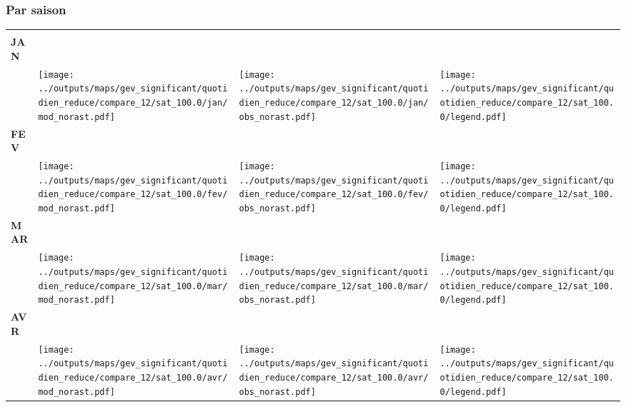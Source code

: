 \documentclass[
  letterpaper,
  DIV=11,
  numbers=noendperiod]{scrartcl}
\begin{document}
\subsubsection{Par saison}\label{par-saison-6}

\begin{longtable*}{m{2.0cm}m{7.9cm}m{7.9cm}m{1cm}}
 & \centering  & \centering  & \tabularnewline
\centering \textbf{JAN} \\[0.2em] \begin{tabular}{r@{\hspace{0.2em}}l}\end{tabular} & \centering \texttt{[image: ../outputs/maps/gev\_significant/quotidien\_reduce/compare\_12/sat\_100.0/jan/mod\_norast.pdf]} & \centering \texttt{[image: ../outputs/maps/gev\_significant/quotidien\_reduce/compare\_12/sat\_100.0/jan/obs\_norast.pdf]} & \centering \texttt{[image: ../outputs/maps/gev\_significant/quotidien\_reduce/compare\_12/sat\_100.0/legend.pdf]} \tabularnewline
\centering \textbf{FEV} \\[0.2em] \begin{tabular}{r@{\hspace{0.2em}}l}\end{tabular} & \centering \texttt{[image: ../outputs/maps/gev\_significant/quotidien\_reduce/compare\_12/sat\_100.0/fev/mod\_norast.pdf]} & \centering \texttt{[image: ../outputs/maps/gev\_significant/quotidien\_reduce/compare\_12/sat\_100.0/fev/obs\_norast.pdf]} & \centering \texttt{[image: ../outputs/maps/gev\_significant/quotidien\_reduce/compare\_12/sat\_100.0/legend.pdf]} \tabularnewline
\centering \textbf{MAR} \\[0.2em] \begin{tabular}{r@{\hspace{0.2em}}l}\end{tabular} & \centering \texttt{[image: ../outputs/maps/gev\_significant/quotidien\_reduce/compare\_12/sat\_100.0/mar/mod\_norast.pdf]} & \centering \texttt{[image: ../outputs/maps/gev\_significant/quotidien\_reduce/compare\_12/sat\_100.0/mar/obs\_norast.pdf]} & \centering \texttt{[image: ../outputs/maps/gev\_significant/quotidien\_reduce/compare\_12/sat\_100.0/legend.pdf]} \tabularnewline
\centering \textbf{AVR} \\[0.2em] \begin{tabular}{r@{\hspace{0.2em}}l}\end{tabular} & \centering \texttt{[image: ../outputs/maps/gev\_significant/quotidien\_reduce/compare\_12/sat\_100.0/avr/mod\_norast.pdf]} & \centering \texttt{[image: ../outputs/maps/gev\_significant/quotidien\_reduce/compare\_12/sat\_100.0/avr/obs\_norast.pdf]} & \centering \texttt{[image: ../outputs/maps/gev\_significant/quotidien\_reduce/compare\_12/sat\_100.0/legend.pdf]} \tabularnewline

\end{longtable*}
\end{document}
